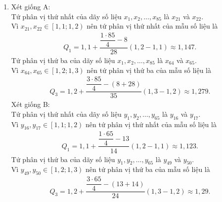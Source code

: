 \begin{ex}
{\begin{enumerate}
			 \item Xét giống A:\\
			 Tứ phân vị thứ nhất của dãy số liệu $x_1, x_2, \ldots, x_{85}$ là $x_{21}$ và $x_{22}$.\\
			Vì  $x_{21}, x_{22} \in \left[1{,}1; 1{,}2\right)$ nên tứ phân vị thứ nhất của mẫu số liệu là
			\begin{align*}
				Q_1=1{,}1+\dfrac{\dfrac{1\cdot 85}{4}-8}{28} \left(1{,}2-1{,}1\right)\approx  1{,}147.
			\end{align*}
			Tứ phân vị thứ ba của dãy  số liệu $x_1, x_2, \ldots, x_{85}$ là $x_{64}$ và $x_{65}$.\\
			Vì $x_{64}, x_{65} \in  \left[1{,}2; 1{,}3\right)$ nên tứ phân vị thứ ba của mẫu số liệu là
			\begin{align*}
				Q_3=1{,}2+\dfrac{\dfrac{3\cdot 85}{4}-\left(8+28\right)}{35} \left(1{,}3-1{,}2\right)\approx  1{,}279.
			\end{align*}
			 Xét giống B:\\
			Tứ phân vị thứ nhất của dãy số liệu $y_1, y_2, \ldots, y_{65}$  là $y_{16}$ và $y_{17}$.\\
			Vì $y_{16}, y_{17} \in \left[1{,}1; 1{,}2\right)$ nên tứ  phân vị thứ nhất của mẫu số liệu là
			\begin{align*}
				 Q_1=1{,}1+\dfrac{\dfrac{1\cdot 65}{4}-13}{14} \left(1{,}2-1{,}1\right)\approx 1{,}123.
			\end{align*}
			Tứ phân vị thứ ba của dãy  số liệu $y_1, y_2, \ldots, y_{65}$ là $y_{49}$ và $y_{50}$.\\
			Vì $y_{49}, y_{50} \in \left[1{,}2; 1{,}3\right)$ nên tứ phân  vị thứ ba của mẫu số liệu là
			\begin{align*}
				Q_3=1{,}2+\dfrac{\dfrac{3\cdot 65}{4}-\left(13+14\right)}{24} \left(1{,}3-1{,}2\right)\approx 1{,}29. 
			\end{align*}
		\end{enumerate}
	 }
\end{ex}

